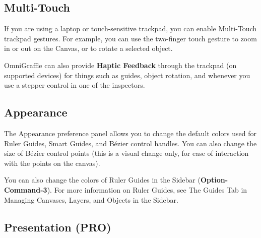 \documentclass[../main.tex]{subfiles}
\begin{document}
\subsection{Multi-Touch}

If you are using a laptop or touch-sensitive trackpad, you can enable Multi-Touch trackpad
gestures. For example, you can use the two-finger touch gesture to zoom in or out on the
Canvas, or to rotate a selected object.


OmniGraffle can also provide \textbf{Haptic Feedback} through the trackpad (on supported
devices) for things such as guides, object rotation, and whenever you use a stepper control in
one of the inspectors.

\subsection{Appearance}

The Appearance preference panel allows you to change the default colors used for Ruler Guides,
Smart Guides, and Bézier control handles. You can also change the size of Bézier control
points (this is a visual change only, for ease of interaction with the points on the canvas).


You can also change the colors of Ruler Guides in the Sidebar (\textbf{Option-Command-3}). For
more information on Ruler Guides, see The Guides Tab in Managing Canvases, Layers, and Objects
in the Sidebar.

\subsection{Presentation (\texorpdfstring{\textbf{PRO}}{PRO})}
\end{document}
